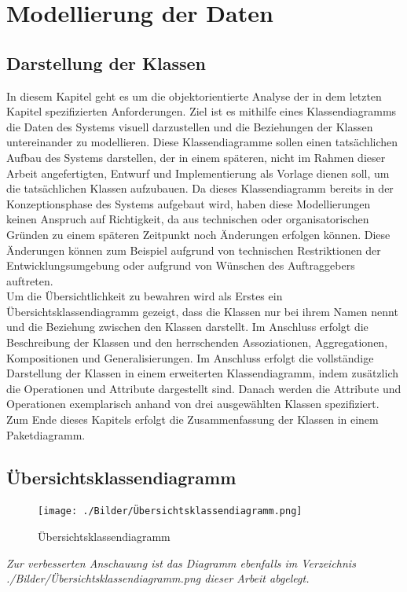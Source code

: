 \section{Modellierung der Daten}
\subsection{Darstellung der Klassen}
In diesem Kapitel geht es um die objektorientierte Analyse der in dem letzten Kapitel spezifizierten Anforderungen. Ziel ist es mithilfe eines Klassendiagramms die Daten des Systems visuell darzustellen und die Beziehungen der Klassen untereinander zu modellieren. Diese Klassendiagramme sollen einen tatsächlichen Aufbau des Systems darstellen, der in einem späteren, nicht im Rahmen dieser Arbeit angefertigten, Entwurf und Implementierung als Vorlage dienen soll, um die tatsächlichen Klassen aufzubauen. Da dieses Klassendiagramm bereits in der Konzeptionsphase des Systems aufgebaut wird, haben diese Modellierungen keinen Anspruch auf Richtigkeit, da aus technischen oder organisatorischen Gründen zu einem späteren Zeitpunkt noch Änderungen erfolgen können. Diese Änderungen können zum Beispiel aufgrund von technischen Restriktionen der Entwicklungsumgebung oder aufgrund von Wünschen des Auftraggebers auftreten.
\\Um die Übersichtlichkeit zu bewahren wird als Erstes ein Übersichtsklassendiagramm gezeigt, dass die Klassen nur bei ihrem Namen nennt und die Beziehung zwischen den Klassen darstellt. Im Anschluss erfolgt die Beschreibung der Klassen und den herrschenden Assoziationen, Aggregationen, Kompositionen und Generalisierungen. Im Anschluss erfolgt die vollständige Darstellung der Klassen in einem erweiterten Klassendiagramm, indem zusätzlich die Operationen und Attribute dargestellt sind. Danach werden die Attribute und Operationen exemplarisch anhand von drei ausgewählten Klassen spezifiziert. Zum Ende dieses Kapitels erfolgt die Zusammenfassung der Klassen in einem Paketdiagramm.    

\newpage
\subsection{Übersichtsklassendiagramm}
\begin{figure}[h!]
    \centering
    \texttt{[image: ./Bilder/Übersichtsklassendiagramm.png]}
    \caption[Übersichtsklassendiagramm]{Übersichtsklassendiagramm}
    \label{fig:Übersichtsklassendiagramm}
\end{figure}
\emph{Zur verbesserten Anschauung ist das Diagramm ebenfalls im Verzeichnis ./Bilder/Übersichtsklassendiagramm.png dieser Arbeit abgelegt.}

